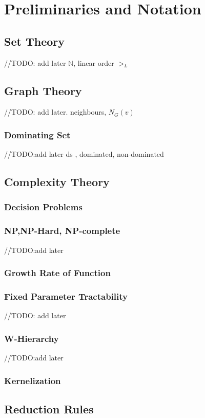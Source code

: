 \chapter{Preliminaries and Notation} \label{chap:prelim}
\section{Set Theory} \label{sec:set}
//TODO: add later $\mathds{N}$, linear order $>_L$
\section{Graph Theory}  \label{sec:graph}
//TODO: add later. neighbours, $N_G$$(v)$
\subsection{Dominating Set}
//TODO:add later ds , dominated, non-dominated
\section{Complexity Theory} \label{sec:complex}
\subsection{Decision Problems} \label{subsec:decision}
\subsection{NP,NP-Hard, NP-complete}
//TODO:add later
\subsection{Growth Rate of Function} \label{subsec:growth}
\subsection{Fixed Parameter Tractability} \label{subsec:fpt}
//TODO: add later
\subsection{W-Hierarchy} \label{subsec:whierarchy}
//TODO:add later
\subsection{Kernelization} \label{subsec:kern}
\section{Reduction Rules} \label{sec:reduce}

